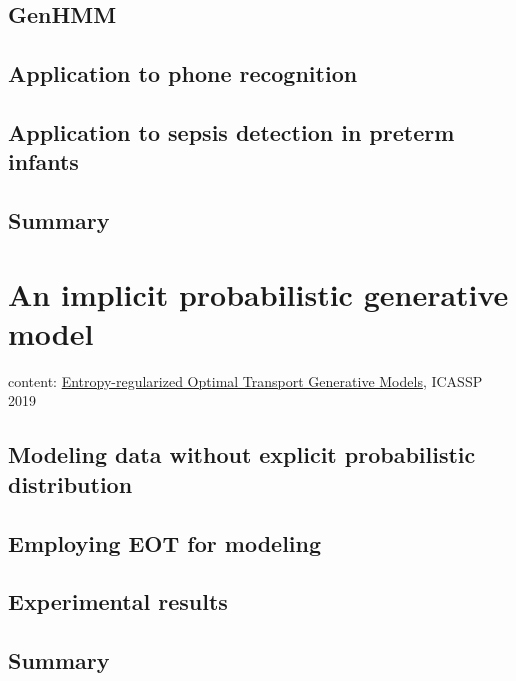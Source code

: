 \section{GenHMM}

\section{Application to phone recognition}

\section{Application to sepsis detection in preterm infants}

\section{Summary}

\chapter{An implicit probabilistic generative model}
content: \href{https://ieeexplore.ieee.org/stamp/stamp.jsp?arnumber=8682721}{Entropy-regularized Optimal Transport Generative Models}, ICASSP 2019


\section{Modeling data without explicit probabilistic distribution}

\section{Employing EOT for modeling}

\section{Experimental results}

\section{Summary}

